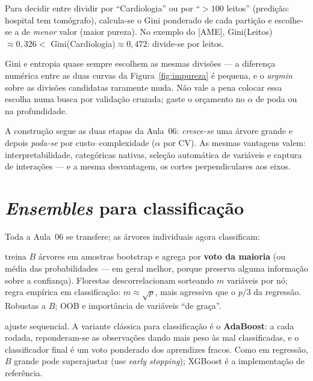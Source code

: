\documentclass[11pt,a4paper]{article}
\begin{document}
\begin{exemplo}
Para decidir entre dividir por ``Cardiologia'' ou por ``$>100$ leitos'' (predição:
hospital tem tomógrafo), calcula-se o Gini ponderado de cada partição e escolhe-se a
de \emph{menor} valor (maior pureza). No exemplo do [AME], Gini(Leitos)$\approx
0{,}326 <$ Gini(Cardiologia)$\approx 0{,}472$: divide-se por leitos.
\end{exemplo}

\begin{observacao}
Gini e entropia quase sempre escolhem as mesmas divisões --- a diferença numérica
entre as duas curvas da Figura~\ref{fig:impureza} é pequena, e o \emph{argmin} sobre
as divisões candidatas raramente muda. Não vale a pena colocar essa escolha numa
busca por validação cruzada; gaste o orçamento no $\alpha$ de poda ou na
profundidade.
\end{observacao}

\noindent A construção segue as duas etapas da Aula~06: \emph{cresce-se} uma árvore
grande e depois \emph{poda-se} por custo--complexidade ($\alpha$ por CV). As mesmas
vantagens valem: interpretabilidade, categóricas nativas, seleção automática de
variáveis e captura de interações --- e a mesma desvantagem, os cortes
perpendiculares aos eixos.

\section{\emph{Ensembles} para classificação}
Toda a Aula~06 se transfere; as árvores individuais agora classificam:
\begin{description}[leftmargin=2.6cm,style=nextline]
  \item[Bagging / Florestas] treina $B$ árvores em amostras bootstrap e agrega por
        \textbf{voto da maioria} (ou média das probabilidades --- em geral melhor,
        porque preserva alguma informação sobre a confiança). Florestas
        descorrelacionam sorteando $m$ variáveis por nó; regra empírica em
        classificação: $m\approx\sqrt{p}$, mais agressiva que o $p/3$ da regressão.
        Robustas a $B$; OOB e importância de variáveis ``de graça''.
  \item[Boosting] ajuste sequencial. A variante clássica para classificação é o
        \textbf{AdaBoost}: a cada rodada, reponderam-se as observações dando mais
        peso às mal classificadas, e o classificador final é um voto ponderado dos
        aprendizes fracos. Como em regressão, $B$ grande pode superajustar (use
        \emph{early stopping}); XGBoost é a implementação de referência.
\end{description}
\end{document}
